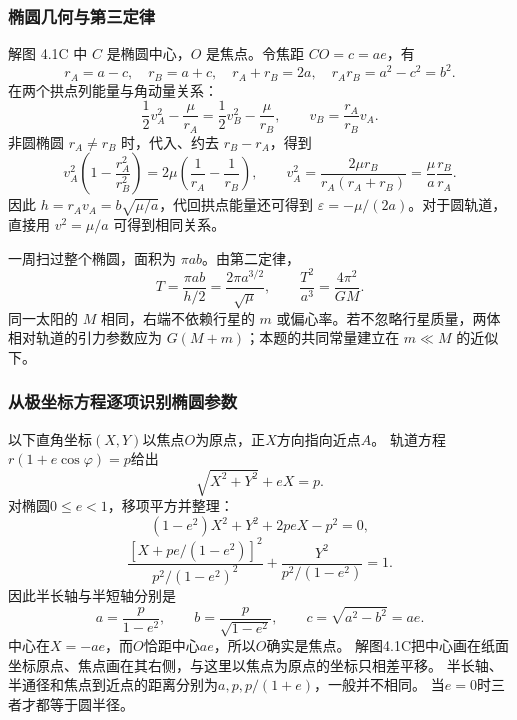 \documentclass[UTF8,fontset=fandol,a4paper,11pt]{ctexart}
\newcommand{\vect}[1]{\bm{#1}}
\newcommand{\figcaption}[1]{\par\vspace{2pt}{\small\color{muted}#1}\par}
\begin{document}
\subsubsection*{椭圆几何与第三定律}
\par\medskip\noindent\begin{minipage}{\linewidth}\centering
{}
\figcaption{解图 4.1C　近、远日点与椭圆的几何参数。}
\end{minipage}\par\medskip

解图 4.1C 中 $C$ 是椭圆中心，$O$ 是焦点。令焦距 $CO=c=ae$，有
\[
r_A=a-c,\quad r_B=a+c,\quad
r_A+r_B=2a,\quad r_Ar_B=a^2-c^2=b^2.
\]
在两个拱点列能量与角动量关系：
\[
\frac12v_A^2-\frac\mu{r_A}
=\frac12v_B^2-\frac\mu{r_B},\qquad
v_B=\frac{r_A}{r_B}v_A.
\]
非圆椭圆 $r_A\ne r_B$ 时，代入、约去 $r_B-r_A$，得到
\[
v_A^2\left(1-\frac{r_A^2}{r_B^2}\right)
=2\mu\left(\frac1{r_A}-\frac1{r_B}\right),
\qquad v_A^2=\frac{2\mu r_B}{r_A(r_A+r_B)}
=\frac\mu a\frac{r_B}{r_A}.
\]
因此 $h=r_Av_A=b\sqrt{\mu/a}$，代回拱点能量还可得到 $\varepsilon=-\mu/(2a)$。对于圆轨道，直接用 $v^2=\mu/a$ 可得到相同关系。

一周扫过整个椭圆，面积为 $\pi ab$。由第二定律，
\[
T=\frac{\pi ab}{h/2}
=\frac{2\pi a^{3/2}}{\sqrt\mu},
\qquad \boxed{\frac{T^2}{a^3}=\frac{4\pi^2}{GM}}.
\]
同一太阳的 $M$ 相同，右端不依赖行星的 $m$ 或偏心率。若不忽略行星质量，两体相对轨道的引力参数应为 $G(M+m)$；本题的共同常量建立在 $m\ll M$ 的近似下。
\subsubsection*{从极坐标方程逐项识别椭圆参数}
以下直角坐标$(X,Y)$以焦点$O$为原点，正$X$方向指向近点$A$。
轨道方程$r(1+e\cos\varphi)=p$给出
\[
\sqrt{X^2+Y^2}+eX=p.
\]
对椭圆$0\leq e<1$，移项平方并整理：
\[
(1-e^2)X^2+Y^2+2peX-p^2=0,
\]
\[
\frac{[X+pe/(1-e^2)]^2}{p^2/(1-e^2)^2}
+\frac{Y^2}{p^2/(1-e^2)}=1.
\]
因此半长轴与半短轴分别是
\[
a=\frac p{1-e^2},\qquad b=\frac p{\sqrt{1-e^2}},\qquad
c=\sqrt{a^2-b^2}=ae.
\]
中心在$X=-ae$，而$O$恰距中心$ae$，所以$O$确实是焦点。
解图4.1C把中心画在纸面坐标原点、焦点画在其右侧，与这里以焦点为原点的坐标只相差平移。
半长轴、半通径和焦点到近点的距离分别为$a,p,p/(1+e)$，一般并不相同。
当$e=0$时三者才都等于圆半径。
\end{document}
